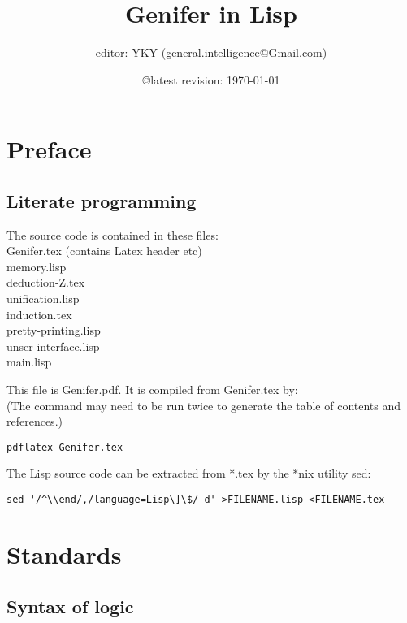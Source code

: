 \documentclass[12pt, a4paper]{report}
\title{\textbf{Genifer in Lisp}}
\author{editor: YKY (general.intelligence@Gmail.com)}
\date{\copyright \quad latest revision: \today}
\newcommand{\tab}{\hspace*{1cm} }
\begin{document}
\renewcommand{\normalsize}{\fontsize{13pt}{15pt}\selectfont}
\fontsize{13pt}{15pt} \selectfont

\maketitle
\dominitoc
\tableofcontents

\chapter{Preface}

\section{Literate programming}

The source code is contained in these files:\\
\tab Genifer.tex (contains Latex header etc) \\
\tab memory.lisp \\
\tab deduction-Z.tex \\
\tab unification.lisp \\
\tab induction.tex \\
\tab pretty-printing.lisp \\
\tab unser-interface.lisp \\
\tab main.lisp

This file is Genifer.pdf.  It is compiled from Genifer.tex by:\\
(The command may need to be run twice to generate the table of contents and references.)
\begin{lstlisting}
pdflatex Genifer.tex
\end{lstlisting}

The Lisp source code can be extracted from *.tex by the *nix utility sed:
\begin{lstlisting}[texcl]
sed '/^\\end/,/language=Lisp\]\$/ d' >FILENAME.lisp <FILENAME.tex
\end{lstlisting}

\chapter{Standards}

\section{Syntax of logic}
\end{document}
